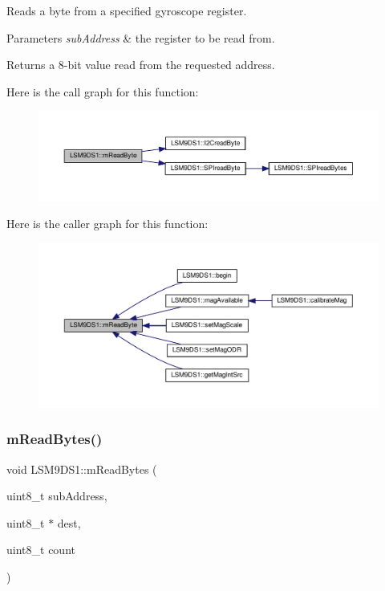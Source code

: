 Reads a byte from a specified gyroscope register. 


\begin{DoxyParams}{Parameters}
{\em sub\+Address} & the register to be read from. \\
\hline
\end{DoxyParams}
\begin{DoxyReturn}{Returns}
a 8-\/bit value read from the requested address. 
\end{DoxyReturn}
Here is the call graph for this function\+:
\nopagebreak
\begin{figure}[H]
\begin{center}
\leavevmode
\includegraphics[width=350pt]{classLSM9DS1_ae4e470321567e4f93fc09f4cc6cd9efa_cgraph}
\end{center}
\end{figure}
Here is the caller graph for this function\+:
\nopagebreak
\begin{figure}[H]
\begin{center}
\leavevmode
\includegraphics[width=350pt]{classLSM9DS1_ae4e470321567e4f93fc09f4cc6cd9efa_icgraph}
\end{center}
\end{figure}
\mbox{\label{classLSM9DS1_acfdf9862cad1e66c9fb61a17bfbe7477}} 
\subsubsection{\texorpdfstring{m\+Read\+Bytes()}{mReadBytes()}}
{\footnotesize\ttfamily void L\+S\+M9\+D\+S1\+::m\+Read\+Bytes (\begin{DoxyParamCaption}\item[{uint8\+\_\+t}]{sub\+Address,  }\item[{uint8\+\_\+t $\ast$}]{dest,  }\item[{uint8\+\_\+t}]{count }\end{DoxyParamCaption})\hspace{0.3cm}{\ttfamily [protected]}}



